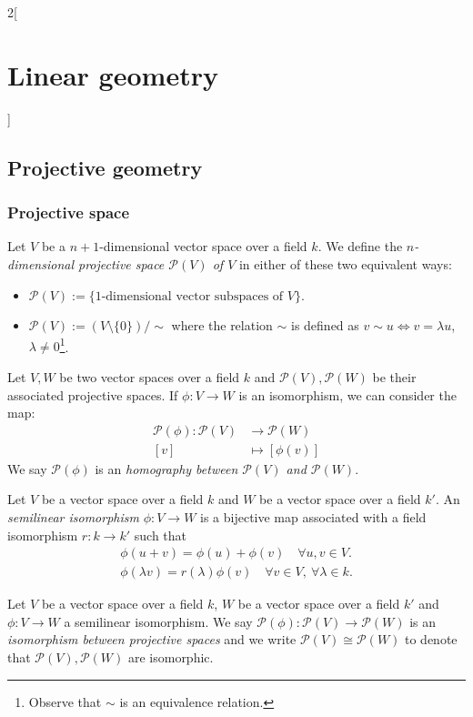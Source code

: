 \documentclass[../../../main.tex]{subfiles}
\begin{document}
\begin{multicols}{2}[\section{Linear geometry}]
\subsection{Projective geometry}
\subsubsection*{Projective space}
\begin{definition}
Let $V$ be a $n+1$-dimensional vector space over a field $k$. We define the \textit{$n$-dimensional projective space $\mathcal{P}(V)$ of $V$} in either of these two equivalent ways:
\begin{itemize}
    \item $\displaystyle\mathcal{P}(V):=\{\text{1-dimensional vector subspaces of $V$}\}$.
    \item $\displaystyle\mathcal{P}(V):=(V\setminus\{0\})/\sim$ where the relation $\sim$ is defined as $v\sim u\iff v=\lambda u$, $\lambda\ne 0$\footnote{Observe that $\sim$ is an equivalence relation.}.
\end{itemize}
\end{definition}
\begin{definition}
Let $V,W$ be two vector spaces over a field $k$ and $\mathcal{P}(V),\mathcal{P}(W)$ be their associated projective spaces. If $\phi:V\rightarrow W$ is an isomorphism, we can consider the map:
\begin{align*}
    \mathcal{P}(\phi):\mathcal{P}(V)&\rightarrow\mathcal{P}(W)\\
    [v]&\mapsto [\phi(v)]
\end{align*}
We say $\mathcal{P}(\phi)$ is an \textit{homography between $\mathcal{P}(V)$ and $\mathcal{P}(W)$}.
\end{definition}
\begin{definition}
Let $V$ be a vector space over a field $k$ and $W$ be a vector space over a field $k'$. An \textit{semilinear isomorphism} $\phi:V\rightarrow W$ is a bijective map associated with a field isomorphism $r:k\rightarrow k'$ such that
\begin{gather*}
    \phi(u+v)=\phi(u)+\phi(v)\quad \forall u,v\in V.\\
    \phi(\lambda v)=r(\lambda)\phi(v)\quad \forall v\in V,\ \forall\lambda\in k.
\end{gather*}
\end{definition}
\begin{definition}
Let $V$ be a vector space over a field $k$, $W$ be a vector space over a field $k'$ and $\phi:V\rightarrow W$ a semilinear isomorphism. We say $\mathcal{P}(\phi):\mathcal{P}(V)\rightarrow\mathcal{P}(W)$ is an \textit{isomorphism between projective spaces} and we write $\mathcal{P}(V)\cong \mathcal{P}(W)$ to denote that $\mathcal{P}(V),\mathcal{P}(W)$ are isomorphic.

\end{definition}
\end{multicols}
\end{document}
